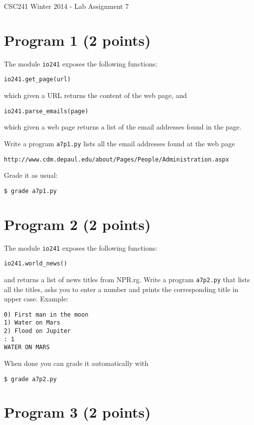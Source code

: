 \documentclass[12pt]{article}
\begin{document}
{\Large CSC241 Winter 2014 - Lab Assignment 7}

\section{Program 1 (2 points)}

\noindent
The module {\tt io241} exposes the following functions:
\begin{verbatim}
io241.get_page(url)
\end{verbatim}
which given a URL returns the content of the web page, and
\begin{verbatim}
io241.parse_emails(page)
\end{verbatim}
which given a web page returns a list of the email addresses found in the page.

Write a program {\tt a7p1.py} lists all the email addresses found at the web page
\begin{verbatim}
http://www.cdm.depaul.edu/about/Pages/People/Administration.aspx
\end{verbatim}
Grade it as usual:
\begin{verbatim}
$ grade a7p1.py
\end{verbatim}


\section{Program 2 (2 points)}

The module {\tt io241} exposes the following functions:
\begin{verbatim}
io241.world_news()
\end{verbatim}
and returns a list of news titles from NPR.rg.
\noindent
Write a program {\tt a7p2.py} that lists all the titles,
asks you to enter a number and prints the corresponding title in upper case. Example:
\begin{verbatim}
0) First man in the moon
1) Water on Mars
2) Flood on Jupiter
: 1
WATER ON MARS
\end{verbatim}

\noindent When done you can grade it automatically with
\begin{verbatim}
$ grade a7p2.py
\end{verbatim}

\section{Program 3 (2 points)}
\end{document}
